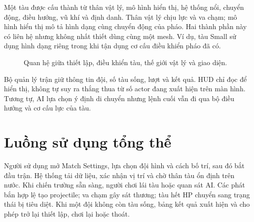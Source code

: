 \documentclass[11pt,a4paper,oneside]{report}
\begin{document}
Một tàu được cấu thành từ thân vật lý, mô hình hiển thị, hệ thống nổi, chuyển động, điều hướng, vũ khí và định danh. Thân vật lý chịu lực và va chạm; mô hình hiển thị mô tả hình dạng cùng chuyển động của pháo. Hai thành phần này có liên hệ nhưng không nhất thiết dùng cùng một mesh. Ví dụ, tàu Small sử dụng hình dạng riêng trong khi tận dụng cơ cấu điều khiển pháo đã có.

\begin{figure}[H]\centering
{}
\caption{Quan hệ giữa thiết lập, điều khiển tàu, thế giới vật lý và giao diện.}
\end{figure}

Bộ quản lý trận giữ thông tin đội, số tàu sống, lượt và kết quả. HUD chỉ đọc để hiển thị, không tự suy ra thắng thua từ số actor đang xuất hiện trên màn hình. Tương tự, AI lựa chọn ý định di chuyển nhưng lệnh cuối vẫn đi qua bộ điều hướng và cơ cấu lực của tàu.

\section{Luồng sử dụng tổng thể}
Người sử dụng mở Match Settings, lựa chọn đội hình và cách bố trí, sau đó bắt đầu trận. Hệ thống tải dữ liệu, xác nhận vị trí và chờ thân tàu ổn định trên nước. Khi chiến trường sẵn sàng, người chơi lái tàu hoặc quan sát AI. Các phát bắn hợp lệ tạo projectile; va chạm gây sát thương; tàu hết HP chuyển sang trạng thái bị tiêu diệt. Khi một đội không còn tàu sống, bảng kết quả xuất hiện và cho phép trở lại thiết lập, chơi lại hoặc thoát.
\end{document}
